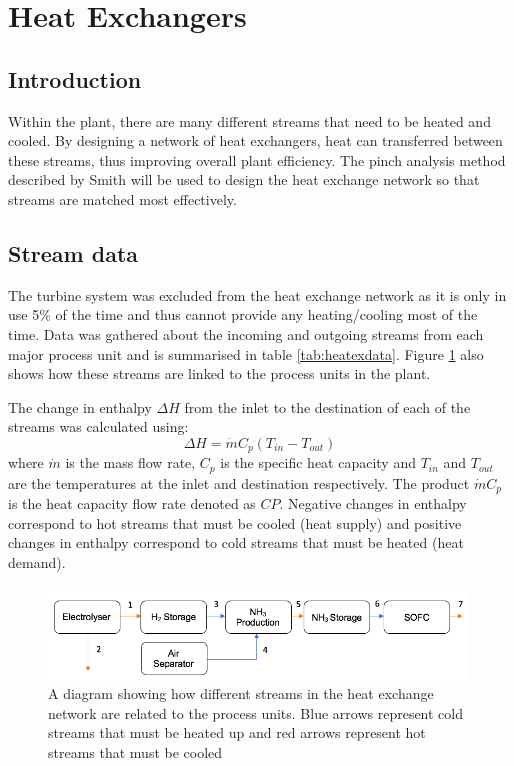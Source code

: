 \documentclass[11pt, oneside]{article}
\begin{document}
\section{Heat Exchangers}
\subsection{Introduction}

Within the plant, there are many different streams that need to be heated and cooled. By designing a network of heat exchangers, heat can transferred between these streams, thus improving overall plant efficiency. The pinch analysis method described by Smith \cite{hexbook} \cite{lecture:hex} will be used to design the heat exchange network so that streams are matched most effectively. 

\subsection{Stream data}
The turbine system was excluded from the heat exchange network as it is only in use 5\% of the time and thus cannot provide any heating/cooling most of the time. Data was gathered about the incoming and outgoing streams from each major process unit and is summarised in table \ref{tab:heatexdata}. Figure \ref{fig:heatexflow} also shows how these streams are linked to the process units in the plant.

The change in enthalpy $\Delta H$ from the inlet to the destination of each of the streams was calculated using:
\begin{equation} \label{eq:heatex}
\Delta H = \dot{m} C_p (T_{in} - T_{out})
\end{equation}
where $\dot{m}$ is the mass flow rate, $C_p$ is the specific heat capacity and $T_{in}$ and $T_{out}$ are the temperatures at the inlet and destination respectively. The product $\dot{m} C_p$ is the heat capacity flow rate denoted as $CP$. Negative changes in enthalpy correspond to hot streams that must be cooled (heat supply) and positive changes in enthalpy correspond to cold streams that must be heated (heat demand).

\begin{figure} [h]
\centering
\includegraphics[width=0.99\textwidth]{./pictures/heatexflow.png}
  \caption{A diagram showing how different streams in the heat exchange network are related to the process units. Blue arrows represent cold streams that must be heated up and red arrows represent hot streams that must be cooled} \label{fig:heatexflow}
\end{figure}
\end{document}

